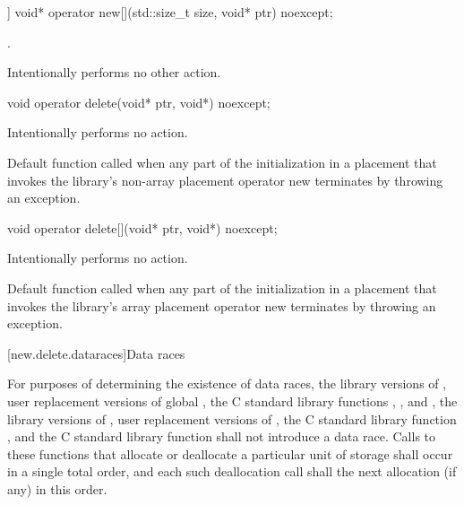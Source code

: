 %
\begin{itemdecl}
[[nodiscard]] void* operator new[](std::size_t size, void* ptr) noexcept;
\end{itemdecl}

\begin{itemdescr}
\pnum
\returns
{}.

\pnum
\remarks
Intentionally performs no other action.
\end{itemdescr}

%
\begin{itemdecl}
void operator delete(void* ptr, void*) noexcept;
\end{itemdecl}

\begin{itemdescr}
\pnum
\effects
Intentionally performs no action.

\pnum
\remarks
Default function called when any part of the initialization in a
placement  that invokes the library's
non-array placement operator new
terminates by throwing an exception.
\end{itemdescr}

%
\begin{itemdecl}
void operator delete[](void* ptr, void*) noexcept;
\end{itemdecl}

\begin{itemdescr}
\pnum
\effects
Intentionally performs no action.

\pnum
\remarks
Default function called when any part of the initialization in a
placement  that invokes the library's
array placement operator new
terminates by throwing an exception.
\end{itemdescr}

[new.delete.dataraces]{Data races}

\pnum
For purposes of determining the existence of data races, the library versions
of , user replacement versions of global ,
the C standard library functions
, , and ,
the library
versions of , user replacement
versions of , the C standard library function
, and the C standard library function  shall not
introduce a data race.
Calls to these functions that allocate or deallocate a particular unit
of storage shall occur in a single total order, and each such deallocation call
shall 
the next allocation (if any) in this order.

